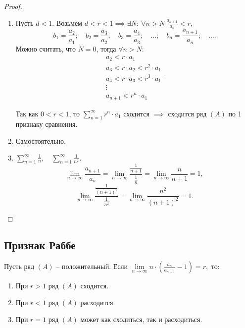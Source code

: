 \begin{proof}\leavevmode
    \begin{enumerate}
        \item Пусть $d < 1$. Возьмем $d < r < 1 \implies \exists N: \ \forall n > N \ \frac{a_{n+1}}{a_n}<r $,
              \[
                  b_1 = \frac{a_2}{a_1}; \quad b_2 = \frac{a_3}{a_2}; \quad b_3 = \frac{a_4}{a_3}; \quad \ldots; \quad b_n = \frac{a_{n+1}}{a_n}; \quad \ldots.
              \]
              Можно считать, что $N=0$, тогда $\forall n > N$:
              \[
                  \begin{array}{l}
                      a_2 < r \cdot a_1                 \\
                      a_3 < r \cdot a_2 < r^2 \cdot a_1 \\
                      a_4 < r \cdot a_3 < r^3 \cdot a_1 \\
                      \vdots                            \\
                      a_{n+1} < r^n \cdot a_1
                  \end{array}.
              \]

              Так как $0 < r < 1$, то $\sum_{n=1}^{\infty} r^n \cdot a_1$ сходится $\implies$ сходится ряд $(A)$ по 1 признаку сравнения.
        \item Самостоятельно.
        \item $\sum_{n=1}^{\infty}\frac{1}{n}, \quad \sum_{n=1}^{\infty}\frac{1}{n^2}$.
              \[
                  \underset{n\rightarrow\infty}{\lim}\frac{a_{n+1}}{a_n} = \underset{n\rightarrow\infty}{\lim}\frac{\frac{1}{n+1}}{\frac{1}{n}} = \underset{n\rightarrow\infty}{\lim}\frac{n}{n+1} = 1,
              \]
              \[
                  \underset{n\rightarrow\infty}{\lim}\frac{\frac{1}{(n+1)^2}}{\frac{1}{n^2}} = \underset{n\rightarrow\infty}{\lim}\frac{n^2}{(n+1)^2} = 1.
              \]
    \end{enumerate}
\end{proof}

\subsection{Признак Раббе}

\begin{theorem}
    Пусть ряд $(A)$ -- положительный. Если $ \underset{n\rightarrow\infty}{\lim}n \cdot \left(\frac{a_n}{a_{n+1}} - 1\right) = r, $ то:
    \begin{enumerate}
        \item При $r>1$ ряд $(A)$ сходится.
        \item При $r<1$ ряд $(A)$ расходится.
        \item При $r=1$ ряд $(A)$ может как сходиться, так и расходиться.
    \end{enumerate}
\end{theorem}

